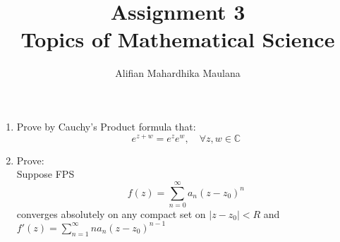\documentclass[a4paper,12pt]{article}
\title{Assignment 3\\ Topics of Mathematical Science}
\author{Alifian Mahardhika Maulana}
\newcommand{\C}{\mathbb{C}}
\begin{document}
\maketitle
\begin{enumerate}
	\item Prove by Cauchy's Product formula that:
	\begin{equation}
	e^{z+w} = e^z e^w,\quad \forall z,w \in \C
	\end{equation}
	
	\item Prove:\\
	Suppose FPS $$f(z) = \sum_{n=0}^{\infty} a_n(z-z_0)^n$$ converges absolutely on any compact set on ${|z-z_0|<R}$ and $f'(z) = \sum_{n=1}^{\infty} n a_n(z-z_0)^{n-1}$
\end{enumerate}
\end{document}
